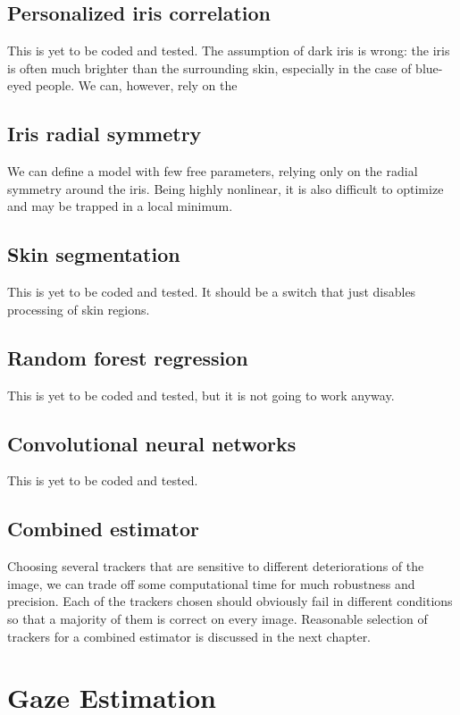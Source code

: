 \subsection{Personalized iris correlation}
This is yet to be coded and tested.
The assumption of dark iris is wrong: the iris is often much brighter than the surrounding skin, especially in the case of blue-eyed people.
We can, however, rely on the 

\subsection{Iris radial symmetry}
We can define a model with few free parameters, relying only on the radial symmetry around the iris.
Being highly nonlinear, it is also difficult to optimize and may be trapped in a local minimum.

\subsection{Skin segmentation}
This is yet to be coded and tested.
It should be a switch that just disables processing of skin regions.

\subsection{Random forest regression}
This is yet to be coded and tested, but it is not going to work anyway.

\subsection{Convolutional neural networks}
This is yet to be coded and tested.

\subsection{Combined estimator}

Choosing several trackers that are sensitive to different deteriorations of the image, we can trade off some computational time for much robustness and precision.
Each of the trackers chosen should obviously fail in different conditions so that a majority of them is correct on every image.
Reasonable selection of trackers for a combined estimator is discussed in the next chapter.

\section{Gaze Estimation}

